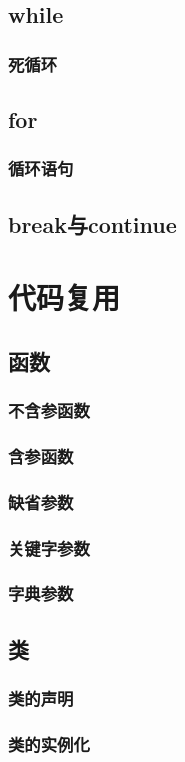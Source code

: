 \documentclass{book}
\begin{document}
\section{while}
\subsection{死循环}
\section{for}
\subsection{循环语句}
\section{break与continue}
\chapter{代码复用}
\section{函数}
\subsection{不含参函数}
\subsection{含参函数}
\subsection{缺省参数}
\subsection{关键字参数}
\subsection{字典参数}
\section{类}
\subsection{类的声明}
\subsection{类的实例化}
\end{document}
